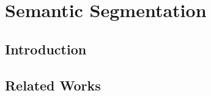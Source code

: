 \chapter{Semantic Segmentation}
\label{cha:semseg}

\begin{chapterabstract}
    \lipsum[2]
\end{chapterabstract}

\section{Introduction}
\label{cha:semseg:sec:introduction}

\section{Related Works}
\label{cha:semseg:sec:relatedworks}